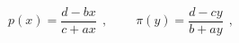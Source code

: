 \begin{equation}
p(x) = \frac{d-bx}{c+ax}\ \ , \ \ \ \ \ \ \ \ \ \
\pi (y) = \frac{d-cy}{b+ay}\ \ ,
\label{2.13}
\end{equation}

